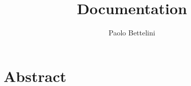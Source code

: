 \documentclass{article}
\title{Documentation}
\author{Paolo Bettelini}
\begin{document}
\maketitle

\tableofcontents

\pagebreak

\section{Abstract}

\pagebreak
\end{document}
